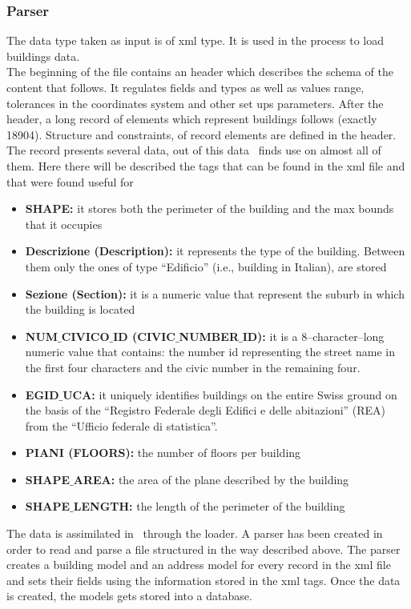 \subsubsection{Parser}
The data type taken as input is of xml type. It is used in the process to load buildings data.\\
The beginning of the file contains an header which describes the schema of the content that follows.
It regulates fields and types as well as values range, tolerances in the coordinates system and other set ups parameters. After the header, a long record of elements which represent buildings follows (exactly 18904). Structure and constraints, of record elements are defined in the header. The record presents several data, out of this data  \applicationName\ finds use on almost all of them. Here there will be described the tags that can be found in the xml file and that were found useful for \applicationName\:
\begin{itemize}
	\item {\bf SHAPE:} it stores both the perimeter of the building and the max bounds that it occupies
	\item {\bf Descrizione (Description):} it represents the type of the building. Between them only the ones of type ``Edificio'' (i.e., building in Italian), are stored
	\item {\bf Sezione (Section):} it is a numeric value that represent the suburb in which the building is located
	\item {\bf NUM$\_$CIVICO$\_$ID (CIVIC$\_$NUMBER$\_$ID):} it is a 8--character--long numeric value that contains: the number id representing the street name in the first four characters and the civic number in the remaining four.
	\item {\bf EGID$\_$UCA:} it uniquely identifies buildings on the entire Swiss ground on the basis of the ``Registro Federale degli Edifici e delle abitazioni'' (REA) from the ``Ufficio federale di statistica''.
	\item {\bf PIANI (FLOORS):} the number of floors per building
	\item {\bf SHAPE$\_$AREA:} the area of the plane described by the building
	\item {\bf SHAPE$\_$LENGTH:} the length of the perimeter of the building
\end{itemize}
The data is assimilated in \applicationName\ through the loader. A parser has been created in order to read and parse a file structured in the way described above. The parser creates a building model and an address model for every record in the xml file and sets their fields using the information stored in the xml tags. Once the data is created, the models gets stored into a database.\\

